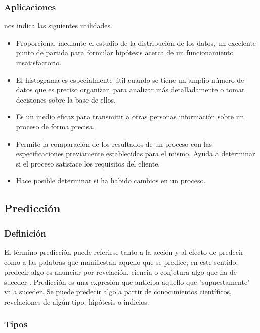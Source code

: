 \subsubsection{Aplicaciones}
\cite{histograma_tipos} nos indica las siguientes utilidades.
\begin{itemize}
	\item Proporciona, mediante el estudio de la distribución de los datos, un excelente punto de partida para formular hipótesis acerca de un funcionamiento insatisfactorio.
	\item El histograma es especialmente útil cuando se tiene un amplio número de datos que es preciso organizar, para analizar más detalladamente o tomar decisiones sobre la base de ellos.
	\item Es un medio eficaz para transmitir a otras personas información sobre un proceso de forma precisa.
	\item Permite la comparación de los resultados de un proceso con las especificaciones previamente establecidas para el mismo. Ayuda a determinar si el proceso satisface los requisitos del cliente.
	\item Hace posible determinar si ha habido cambios en un proceso.
	
\end{itemize}


\subsection{Predicción}

\subsubsection{Definición}

El término predicción puede referirse tanto a la acción y al efecto de predecir como a las palabras que manifiestan aquello que se predice; en este sentido, predecir algo es anunciar por revelación, ciencia o conjetura algo que ha de suceder \citep{rae_prediccion}.
\vskip 0.2cm 
Predicción es una expresión que anticipa aquello que "supuestamente" va a suceder. Se puede predecir algo a partir de conocimientos científicos, revelaciones de algún tipo, hipótesis o indicios.

\subsubsection{Tipos}

